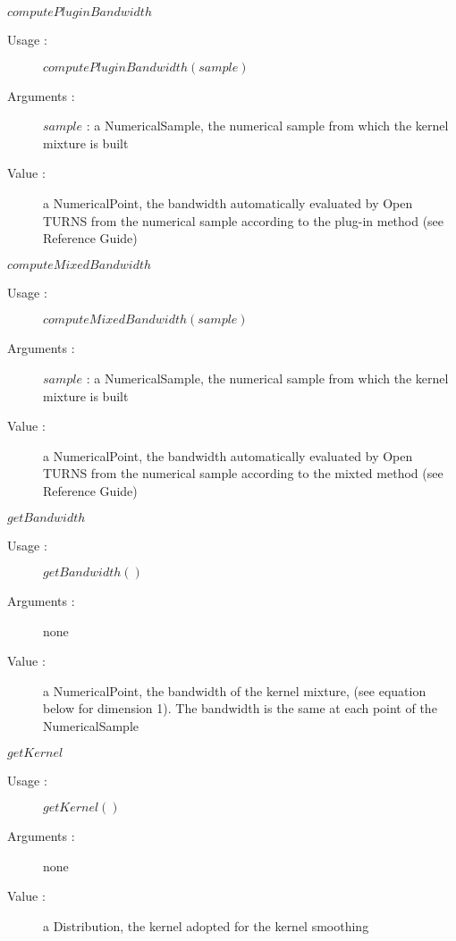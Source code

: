 \begin{description}
\begin{description}
  \item $computePluginBandwidth$
    \begin{description}
    \item[Usage :] $computePluginBandwidth(sample)$
    \item[Arguments :] $sample$ : a NumericalSample, the numerical sample from which the kernel mixture is built
    \item[Value :] a NumericalPoint, the bandwidth automatically evaluated by Open TURNS from the numerical sample according to the plug-in method (see Reference Guide)
    \end{description}
    \bigskip

  \item $computeMixedBandwidth$
    \begin{description}
    \item[Usage :] $computeMixedBandwidth(sample)$
    \item[Arguments :] $sample$ : a NumericalSample, the numerical sample from which the kernel mixture is built
    \item[Value :] a NumericalPoint, the bandwidth automatically evaluated by Open TURNS from the numerical sample according to the mixted method (see Reference Guide)
    \end{description}
    \bigskip

  \item $getBandwidth$
    \begin{description}
    \item[Usage :] $getBandwidth()$
    \item[Arguments :] none
    \item[Value :] a NumericalPoint, the bandwidth of the kernel mixture, (see equation below for dimension 1). The bandwidth is the same at each point of the NumericalSample
    \end{description}
    \bigskip

  \item $getKernel$
    \begin{description}
    \item[Usage :] $getKernel()$
    \item[Arguments :] none
    \item[Value :] a Distribution, the kernel adopted for the kernel smoothing
    \end{description}


  \end{description}


\end{description}
